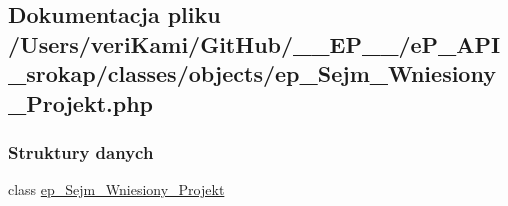 \hypertarget{ep___sejm___wniesiony___projekt_8php}{\subsection{Dokumentacja pliku /\-Users/veri\-Kami/\-Git\-Hub/\-\_\-\-\_\-\-E\-P\-\_\-\-\_\-/e\-P\-\_\-\-A\-P\-I\-\_\-srokap/classes/objects/ep\-\_\-\-Sejm\-\_\-\-Wniesiony\-\_\-\-Projekt.php}
\label{ep___sejm___wniesiony___projekt_8php}
}
\subsubsection*{Struktury danych}
\begin{DoxyCompactItemize}
\item 
class \hyperlink{classep___sejm___wniesiony___projekt}{ep\-\_\-\-Sejm\-\_\-\-Wniesiony\-\_\-\-Projekt}
\end{DoxyCompactItemize}

